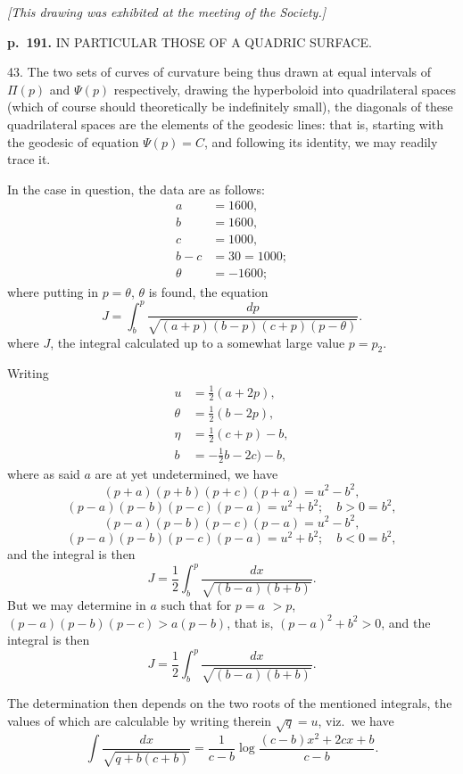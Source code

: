 \documentclass[11pt,a4paper]{book}
\begin{document}
\rule{0pt}{0pt} \hfill {\footnotesize\textit{[This drawing was exhibited at the meeting of the Society.]}}

\clearpage

\noindent
\textbf{p.~191.}  IN PARTICULAR THOSE OF A QUADRIC SURFACE.

43. The two sets of curves of curvature being thus drawn at equal intervals of $\Pi(p)$ and $\Psi(p)$ respectively, drawing the hyperboloid into quadrilateral spaces (which of course should theoretically be indefinitely small), the diagonals of these quadrilateral spaces are the elements of the geodesic lines: that is, starting with the geodesic of equation $\Psi(p) = C$, and following its identity, we may readily trace it.

In the case in question, the data are as follows:
\begin{align*}
a &= 1600, \\
b &= 1600, \\
c &= 1000, \\
b - c &= 30 = 1000; \\
\theta &= -1600;
\end{align*}
where putting in $p = \theta$, $\theta$ is found, the equation
\[
J = \int_b^{p} \frac{dp}{\sqrt{(a + p)(b - p)(c + p)(p - \theta)}}.
\]
where $J$, the integral calculated up to a somewhat large value $p = p_2$.

Writing
\begin{align*}
u &= \tfrac{1}{2}(a + 2p), \\
\theta &= \tfrac{1}{2}(b - 2p), \\
\eta &= \tfrac{1}{2}(c + p) - b, \\
b &= -\tfrac{1}{2}b - 2c) - b,
\end{align*}
where as said $a$ are at yet undetermined, we have
\[
(p + a)(p + b)(p + c)(p + a) = u^2 - b^2,
\]
\[
(p - a)(p - b)(p - c)(p - a) = u^2 + b^2; \quad b > 0 = b^2,
\]
\[
(p - a)(p - b)(p - c)(p - a) = u^2 - b^2,
\]
\[
(p - a)(p - b)(p - c)(p - a) = u^2 + b^2; \quad b < 0 = b^2,
\]
and the integral is then
\[
J = \frac{1}{2}\int_b^{p} \frac{dx}{\sqrt{(b - a)(b + b)}}.
\]
But we may determine in $a$ such that for $p = a$ $> p$, $(p - a)(p - b)(p - c) > a (p - b)$, that is, $(p - a)^2 + b^2 > 0$, and the integral is then
\[
J = \frac{1}{2}\int_b^{p} \frac{dx}{\sqrt{(b - a)(b + b)}}.
\]

The determination then depends on the two roots of the mentioned integrals, the values of which are calculable by writing therein $\sqrt{q} = u$, viz.\ we have
\[
\int \frac{dx}{\sqrt{q + b(c + b)}} = \frac{1}{c - b} \log \frac{(c - b)x^2 + 2cx + b}{c - b}.
\]
\end{document}
